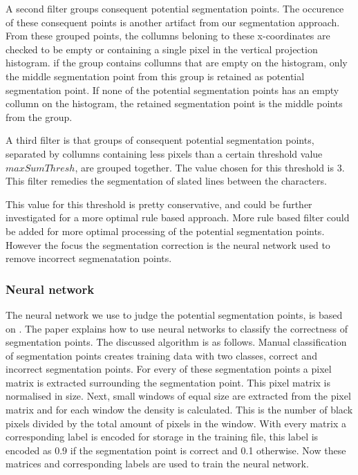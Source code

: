 \documentclass{article}
\begin{document}
A second filter groups consequent potential segmentation points.
The occurence of these consequent points is another artifact from our segmentation approach.
From these grouped points, the collumns beloning to these x-coordinates are checked to be empty or containing a single pixel in the vertical projection histogram.
if the group contains collumns that are empty on the histogram, only the middle segmentation point from this group is retained as potential segmentation point.
If none of the potential segmentation points has an empty collumn on the histogram, the retained segmentation point is the middle points from the group.

A third filter is that groups of consequent potential segmentation points, separated by collumns containing less pixels than a certain threshold value $maxSumThresh$, are grouped together.
The value chosen for this threshold is 3.
This filter remedies the segmentation of slated lines between the characters.

This value for this threshold is pretty conservative, and could be further investigated for a more optimal rule based approach.
More rule based filter could be added for more optimal processing of the potential segmentation points.
However the focus the segmentation correction is the neural network used to remove incorrect segmenatation points.


\subsubsection{Neural network}
The neural network we use to judge the potential segmentation points, is based on \cite{evalsplitpointsnn}. The paper explains how to use neural networks to classify the correctness of segmentation points. The discussed algorithm is as follows. Manual classification of segmentation points creates training data with two classes, correct and incorrect segmentation points. 
For every of these segmentation points a pixel matrix is extracted surrounding the segmentation point. This pixel matrix is normalised in size. 
Next, small windows of equal size are extracted from the pixel matrix and for each window the density is calculated. This is the number of black pixels divided by the total amount of pixels in the window. 
With every matrix a corresponding label is encoded for storage in the training file, this label is encoded as 0.9 if the segmentation point is correct and 0.1 otherwise. Now these matrices and corresponding labels are used to train the neural network. 
\end{document}
